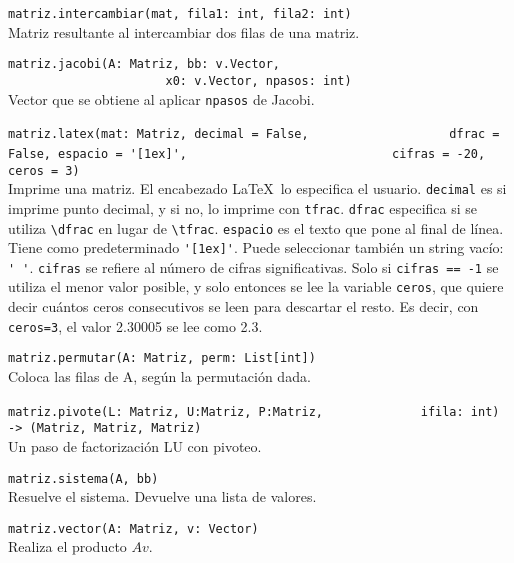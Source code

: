 \documentclass[10pt,landscape]{article}
\begin{document}
\begin{multicols}{3}
\begin{asparaitem}
\item \verb|matriz.intercambiar(mat, fila1: int, fila2: int)| \\
  \quad Matriz resultante al intercambiar dos filas de una matriz.

\item \verb|matriz.jacobi(A: Matriz, bb: v.Vector, |\\
      \verb|                      x0: v.Vector, npasos: int)| \\
      \quad Vector que se obtiene al aplicar \verb|npasos| de Jacobi.

\item \verb|matriz.latex(mat: Matriz, decimal = False,|
  \verb|                   dfrac = False, espacio = '[1ex]',|
  \verb|                            cifras = -20, ceros = 3)| \\
  \quad Imprime una matriz. El encabezado \LaTeX\  lo especifica el usuario. \verb|decimal| es si imprime punto decimal, y si no, lo imprime con \verb|tfrac|. \verb|dfrac| especifica si se utiliza \verb|\dfrac| en lugar de \verb|\tfrac|. \verb|espacio| es el texto que pone al final de l\'inea. Tiene como predeterminado \verb|'[1ex]'|. Puede seleccionar tambi\'en un string vac\'io: \verb|' '|. \verb|cifras| se refiere al n\'umero de cifras significativas. Solo si \verb|cifras == -1| se utiliza el menor valor posible, y solo entonces se lee la variable \verb|ceros|, que quiere decir cu\'antos ceros consecutivos se leen para descartar el resto. Es decir, con \verb|ceros=3|, el valor 2.30005 se lee como 2.3.

\item \verb|matriz.permutar(A: Matriz, perm: List[int])| \\
\quad Coloca las filas de A, según la permutación dada.

\item \verb|matriz.pivote(L: Matriz, U:Matriz, P:Matriz,|
  \verb|             ifila: int) -> (Matriz, Matriz, Matriz)| \\
  \quad Un paso de factorizaci\'on LU con pivoteo.

\item \verb|matriz.sistema(A, bb)|\\
  \quad Resuelve el sistema. Devuelve una lista de valores.

\item \verb|matriz.vector(A: Matriz, v: Vector)| \\
  \quad Realiza el producto $Av$.
\end{asparaitem}



\end{multicols}
\end{document}
